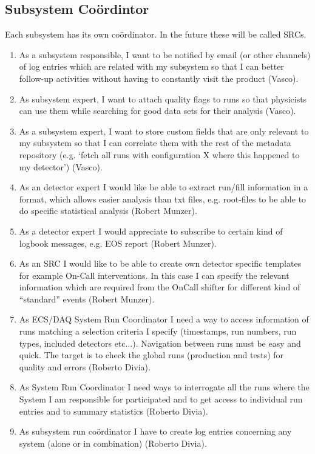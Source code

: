 \subsection{Subsystem Co\"ordintor}
Each subsystem has its own co\"ordinator. In the future these will be called SRCs.
\begin{enumerate}
  \item As a subsystem responsible, I want to be notified by email (or other channels) of log entries which are related with my subsystem so that I can better follow-up activities without having to constantly visit the product (Vasco). 
  \item As subsystem expert, I want to attach quality flags to runs so that physicists can use them while searching for good data sets for their analysis (Vasco). 
  \item As a subsystem expert, I want to store custom fields that are only relevant to my subsystem so that I can correlate them with the rest of the metadata repository (e.g. ‘fetch all runs with configuration X where this happened to my detector’) (Vasco). 
  \item As an detector expert I would like be able to extract run/fill information in a format, which allows easier
analysis than txt files, e.g. root-files to be able to do specific statistical analysis (Robert Munzer).
  \item As a detector expert I would appreciate to subscribe to certain kind of logbook messages, e.g. EOS report (Robert Munzer).
  \item As an SRC I would like to be able to create own detector specific templates for example On-Call interventions. In this case I can specify the relevant information which are required from the OnCall shifter for different kind of “standard” events (Robert Munzer).
  \item As ECS/DAQ System Run Coordinator I need a way to access information of runs matching a selection criteria I specify (timestamps, run numbers, run types, included detectors etc...). Navigation between runs must be easy and quick. The target is to check the global runs (production and tests) for quality and errors (Roberto Divia).
  \item As System Run Coordinator I need ways to interrogate all the runs where the System I am responsible for participated and to get access to individual run entries and to summary statistics (Roberto Divia).
  \item As subsystem run co\"ordinator I have to create log entries concerning any system (alone or in combination) (Roberto Divia).

\end{enumerate}
